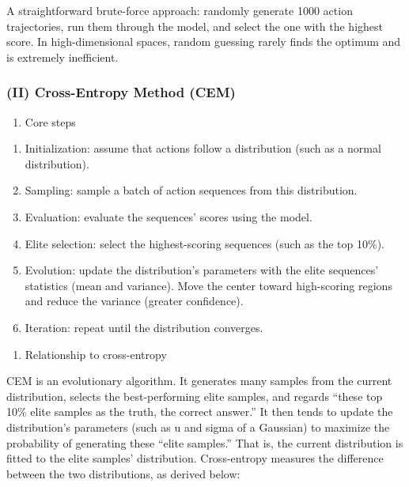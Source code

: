 A straightforward brute-force approach: randomly generate 1000 action trajectories, run them through the model, and select the one with the highest score. In high-dimensional spaces, random guessing rarely finds the optimum and is extremely inefficient.

\hypertarget{ii-cross-entropy-method-cem}{%
\subsubsection{(II) Cross-Entropy Method (CEM)}\label{ii-cross-entropy-method-cem}}

\begin{enumerate}
\def\labelenumi{\arabic{enumi}.}
\tightlist
\item
  Core steps
\end{enumerate}

\begin{enumerate}
\def\labelenumi{(\arabic{enumi})}
\item
  Initialization: assume that actions follow a distribution (such as a normal distribution).
\item
  Sampling: sample a batch of action sequences from this distribution.
\item
  Evaluation: evaluate the sequences' scores using the model.
\item
  Elite selection: select the highest-scoring sequences (such as the top 10\%).
\item
  Evolution: update the distribution's parameters with the elite sequences' statistics (mean and variance). Move the center toward high-scoring regions and reduce the variance (greater confidence).
\item
  Iteration: repeat until the distribution converges.
\end{enumerate}

\begin{enumerate}
\def\labelenumi{\arabic{enumi}.}
\setcounter{enumi}{1}
\tightlist
\item
  Relationship to cross-entropy
\end{enumerate}

CEM is an evolutionary algorithm. It generates many samples from the current distribution, selects the best-performing elite samples, and regards ``these top 10\% elite samples as the truth, the correct answer.'' It then tends to update the distribution's parameters (such as u and sigma of a Gaussian) to maximize the probability of generating these ``elite samples.'' That is, the current distribution is fitted to the elite samples' distribution. Cross-entropy measures the difference between the two distributions, as derived below:

